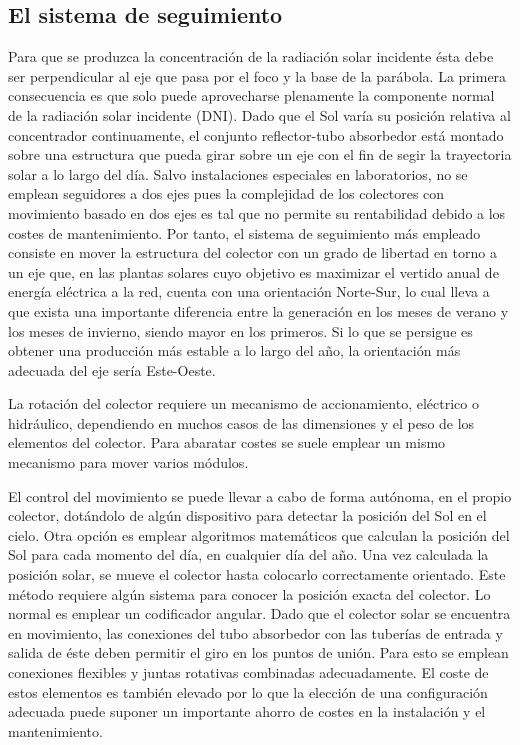 \subsection{El sistema de seguimiento}
\label{sistemadeseguimiento}
Para que se produzca la concentración de la radiación solar incidente ésta debe ser perpendicular al eje que pasa por el foco y la base de la parábola. La primera consecuencia es que solo puede aprovecharse plenamente la componente normal de la radiación solar incidente (DNI). Dado que el Sol varía su posición relativa al concentrador continuamente, el conjunto reflector-tubo absorbedor está montado sobre una estructura que pueda girar sobre un eje con el fin de segir la trayectoria solar a lo largo del día. Salvo instalaciones especiales en laboratorios, no se emplean seguidores a dos ejes pues la complejidad de los colectores con movimiento basado en dos ejes es tal que no permite su rentabilidad debido a los costes de mantenimiento. Por tanto, el sistema de seguimiento más empleado consiste en mover la estructura del colector con un grado de libertad en torno a un eje que, en las plantas solares cuyo objetivo es maximizar el vertido anual de energía eléctrica a la red, cuenta con una orientación Norte-Sur, lo cual lleva a que exista una importante diferencia entre la generación en los meses de verano y los meses de invierno, siendo mayor en los primeros. Si lo que se persigue es obtener una producción más estable a lo largo del año, la orientación más adecuada del eje sería Este-Oeste.

La rotación del colector requiere un mecanismo de accionamiento, eléctrico o hidráulico,
dependiendo en muchos casos de las dimensiones y el peso de los elementos del colector. Para abaratar costes se suele emplear un mismo mecanismo para mover varios módulos.

El control del movimiento se puede llevar a cabo de forma autónoma, en el propio colector, dotándolo de algún dispositivo para detectar la posición del Sol en el cielo. Otra opción es emplear algoritmos matemáticos que calculan la posición del Sol para cada momento del día, en cualquier día del año. Una vez calculada la posición solar, se mueve el colector hasta colocarlo correctamente orientado. Este método requiere algún sistema para conocer la posición exacta del colector. Lo normal es emplear un codificador angular.
Dado que el colector solar se encuentra en movimiento, las conexiones del tubo absorbedor con las tuberías de entrada y salida de éste deben permitir el giro en los puntos de unión. Para esto se emplean conexiones flexibles y juntas rotativas combinadas adecuadamente. El coste de estos elementos es también elevado por lo que la elección de una configuración adecuada puede suponer un importante ahorro de costes en la instalación y el mantenimiento.

